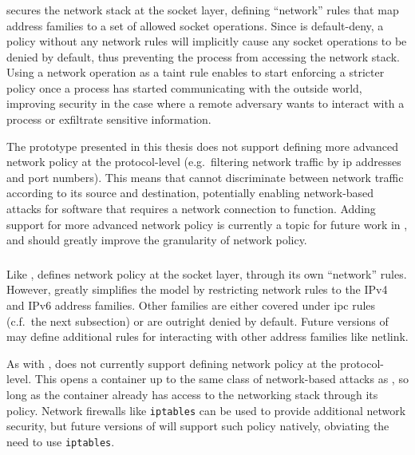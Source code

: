 \subsubsection{\bpfbox{}}

\bpfbox{} secures the network stack at the socket layer, defining \enquote{network} rules
that map address families to a set of allowed socket operations. Since \bpfbox{} is
default-deny, a policy without any network rules will implicitly cause any socket
operations to be denied by default, thus preventing the process from accessing the network
stack. Using a network operation as a taint rule enables \bpfbox{} to start enforcing
a stricter policy once a process has started communicating with the outside world,
improving security in the case where a remote adversary wants to interact with a process
or exfiltrate sensitive information.

The \bpfbox{} prototype presented in this thesis does not support defining more advanced
network policy at the protocol-level (e.g.~filtering network traffic by \gls{ip} addresses
and port numbers). This means that \bpfbox{} cannot discriminate between network traffic
according to its source and destination, potentially enabling network-based attacks for
software that requires a network connection to function.  Adding support for more advanced
network policy is currently a topic for future work in \bpfcontain{}, and should greatly
improve the granularity of network policy.

\subsubsection{\bpfcontain{}}

Like \bpfbox{}, \bpfcontain{} defines network policy at the socket layer, through its own
\enquote{network} rules. However, \bpfcontain{} greatly simplifies the \bpfbox{} model by
restricting network rules to the IPv4 and IPv6 address families. Other families are either
covered under \gls{ipc} rules (c.f.~the next subsection) or are outright denied by
default. Future versions of \bpfcontain{} may define additional rules for interacting with
other address families like netlink.

As with \bpfbox{}, \bpfcontain{} does not currently support defining network policy at the
protocol-level. This opens a \bpfcontain{} container up to the same class of network-based
attacks as \bpfbox{}, so long as the container already has access to the networking stack
through its \bpfcontain{} policy. Network firewalls like \texttt{iptables} can be used to
provide additional network security, but future versions of \bpfcontain{} will support
such policy natively, obviating the need to use \texttt{iptables}.

